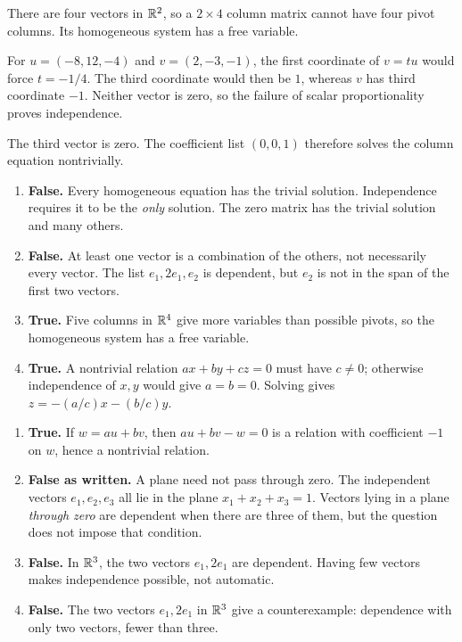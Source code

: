 There are four vectors in $\mathbb{R}^2$, so a $2\times4$ column matrix
cannot have four pivot columns. Its homogeneous system has a free variable.

For $u=(-8,12,-4)$ and $v=(2,-3,-1)$, the first coordinate of
$v=tu$ would force $t=-1/4$. The third coordinate would then be
$1$, whereas $v$ has third coordinate $-1$. Neither vector is zero,
so the failure of scalar proportionality proves independence.

The third vector is zero. The coefficient list $(0,0,1)$ therefore
solves the column equation nontrivially.

\begin{enumerate}[label=(\alph*)]
\item \textbf{False.} Every homogeneous equation has the trivial solution.
Independence requires it to be the \emph{only} solution. The zero matrix
has the trivial solution and many others.
\item \textbf{False.} At least one vector is a combination of the others,
not necessarily every vector. The list $e_1,2e_1,e_2$ is dependent,
but $e_2$ is not in the span of the first two vectors.
\item \textbf{True.} Five columns in $\mathbb{R}^4$ give more variables than
possible pivots, so the homogeneous system has a free variable.
\item \textbf{True.} A nontrivial relation $ax+by+cz=0$ must have
$c\ne0$; otherwise independence of $x,y$ would give $a=b=0$.
Solving gives $z=-(a/c)x-(b/c)y$.
\end{enumerate}

\begin{enumerate}[label=(\alph*)]
\item \textbf{True.} If $w=au+bv$, then $au+bv-w=0$ is a relation
with coefficient $-1$ on $w$, hence a nontrivial relation.
\item \textbf{False as written.} A plane need not pass through zero.
The independent vectors $e_1,e_2,e_3$ all lie in the plane
$x_1+x_2+x_3=1$. Vectors lying in a plane \emph{through zero} are dependent
when there are three of them, but the question does not impose that condition.
\item \textbf{False.} In $\mathbb{R}^3$, the two vectors $e_1,2e_1$ are dependent.
Having few vectors makes independence possible, not automatic.
\item \textbf{False.} The two vectors $e_1,2e_1$ in $\mathbb{R}^3$ give a
counterexample: dependence with only two vectors, fewer than three.
\end{enumerate}

